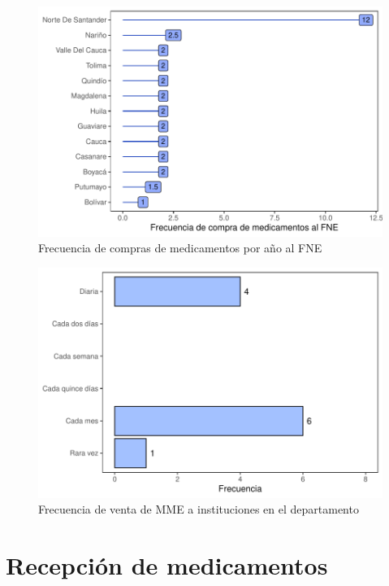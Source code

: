\documentclass[
]{book}
\begin{document}
\begin{figure}
\includegraphics[width=0.9\linewidth]{InformeFinal_files/figure-latex/FrecComprasFNR-1} \caption{Frecuencia de compras de medicamentos por año al FNE}\label{fig:FrecComprasFNR}
\end{figure}

\begin{figure}
\includegraphics[width=0.85\linewidth]{InformeFinal_files/figure-latex/FrecVentaInstituciones-1} \caption{Frecuencia de venta de MME a instituciones en el departamento}\label{fig:FrecVentaInstituciones}
\end{figure}

\hypertarget{recepciuxf3n-de-medicamentos}{%
\section{Recepción de medicamentos}\label{recepciuxf3n-de-medicamentos}}
\end{document}
